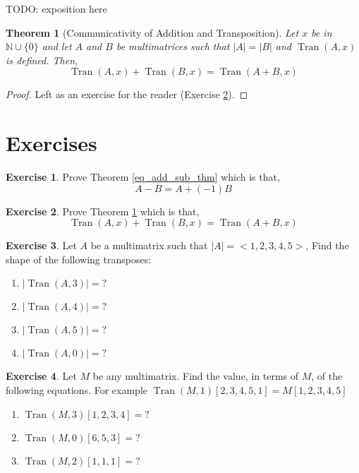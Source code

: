 \documentclass[12pt]{book}
\theoremstyle{plain}
\newtheorem{theorem}{Theorem}[chapter]
\theoremstyle{definition}
\newtheorem{exercise}{Exercise}[chapter]
\theoremstyle{ppart}
\theoremstyle{case}
\theoremstyle{solution}
\DeclareMathOperator{\Tran}{Tran}
\newcommand{\shape}[1]{\left|#1\right|}
\begin{document}
TODO: exposition here

\begin{theorem}[Communicativity of Addition and Transposition]
\label{com_add_tran_thm}
Let $x$ be in $\mathbb{N} \cup \{0\}$ and let $A$ and $B$ be
multimatrices such that $\shape{A} = \shape{B}$ and $\Tran(A, x)$ is defined.
Then,
\[ \Tran(A, x) + \Tran(B, x) = \Tran(A+B, x) \]
\end{theorem}
\begin{proof}
Left as an exercise for the reader (Exercise \ref{com_add_tran_ex}).
\end{proof}

\section{Exercises}

\begin{exercise}
\label{eq_add_sub_ex}
Prove Theorem \ref{eq_add_sub_thm} which is that,
\[ A - B = A + (-1)B \]
\end{exercise}

\begin{exercise}
\label{com_add_tran_ex}
Prove Theorem \ref{com_add_tran_thm} which is that,
\[ \Tran(A, x) + \Tran(B, x) = \Tran(A+B, x) \]
\end{exercise}

\begin{exercise}
Let $A$ be a multimatrix such that $\shape{A} = <1,2,3,4,5>$,
Find the shape of the following transposes:
\begin{enumerate}
\item $\shape{\Tran(A, 3)} = ?$
\item $\shape{\Tran(A, 4)} = ?$
\item $\shape{\Tran(A, 5)} = ?$
\item $\shape{\Tran(A, 0)} = ?$
\end{enumerate}
\end{exercise}

\begin{exercise}
Let $M$ be any multimatrix.
Find the value, in terms of $M$, of the following equations.
For example $\Tran(M, 1)[2,3,4,5,1] = M[1,2,3,4,5]$
\begin{enumerate}
\item $\Tran(M, 3)[1,2,3,4] = ?$
\item $\Tran(M, 0)[6,5,3] = ?$
\item $\Tran(M, 2)[1,1,1] = ?$
\end{enumerate}
\end{exercise}
\end{document}
